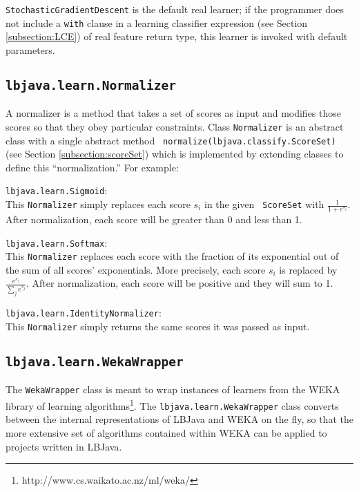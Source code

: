 {\tt StochasticGradientDescent} is the default real learner; if the programmer
does not include a {\tt with} clause in a learning classifier expression (see
Section \ref{subsection:LCE}) of real feature return type, this learner is
invoked with default parameters.

\subsection{{\tt lbjava.learn.Normalizer}}
A normalizer is a method that takes a set of scores as input and modifies
those scores so that they obey particular constraints.  Class {\tt Normalizer}
is an abstract class with a single abstract method {\tt
normalize(lbjava.classify.ScoreSet)} (see Section \ref{subsection:scoreSet})
which is implemented by extending classes to define this ``normalization.''
For example:

\begin{list}{}{}
\item[{\tt lbjava.learn.Sigmoid}:] ~\\
This {\tt Normalizer} simply replaces each score $s_i$ in the given {\tt
ScoreSet} with $\frac{1}{1 + e^{s_i}}$.  After normalization, each score will
be greater than 0 and less than 1.

\item[{\tt lbjava.learn.Softmax}:] ~\\
This {\tt Normalizer} replaces each score with the fraction of its exponential
out of the sum of all scores' exponentials.  More precisely, each score $s_i$
is replaced by $\frac{e^{s_i}}{\sum_j e^{s_j}}$.  After normalization, each
score will be positive and they will sum to 1.

\item[{\tt lbjava.learn.IdentityNormalizer}:] ~\\
This {\tt Normalizer} simply returns the same scores it was passed as input.
\end{list}

\subsection{{\tt lbjava.learn.WekaWrapper}}
The {\tt WekaWrapper} class is meant to wrap instances of learners from the
WEKA library of learning
algorithms\footnote{http://www.cs.waikato.ac.nz/ml/weka/}.  The
{\tt lbjava.learn.WekaWrapper} class converts between the internal
representations of LBJava and WEKA on the fly, so that the more extensive set of
algorithms contained within WEKA can be applied to projects written in LBJava.\\

